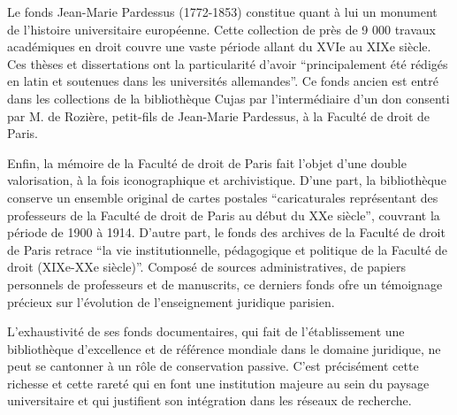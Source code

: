 Le fonds Jean-Marie Pardessus (1772-1853) constitue quant à lui un monument de l'histoire universitaire européenne. Cette collection de près de 9 000 travaux académiques en droit couvre une vaste période allant du XVIe au XIXe siècle. Ces thèses et dissertations ont la particularité d'avoir \enquote{principalement été rédigés en latin et soutenues dans les universités allemandes}. Ce fonds ancien est entré dans les collections de la bibliothèque Cujas par l'intermédiaire d'un don consenti par M. de Rozière, petit-fils de Jean-Marie Pardessus, à la Faculté de droit de Paris. 

Enfin, la mémoire de la Faculté de droit de Paris fait l'objet d'une double valorisation, à la fois iconographique et archivistique. D'une part, la bibliothèque conserve un ensemble original de cartes postales \enquote{caricaturales représentant des professeurs de la Faculté de droit de Paris au début du XXe siècle}, couvrant la période de 1900 à 1914. D'autre part, le fonds des archives de la Faculté de droit de Paris retrace \enquote{la vie institutionnelle, pédagogique et politique de la Faculté de droit (XIXe-XXe siècle)}. Composé de sources administratives, de papiers personnels de professeurs et de manuscrits, ce derniers fonds ofre un témoignage précieux sur l'évolution de l'enseignement juridique parisien.
	
L'exhaustivité de ses fonds documentaires, qui fait de l'établissement une bibliothèque d'excellence et de référence mondiale dans le domaine juridique, ne peut se cantonner à un rôle de conservation passive. C'est précisément cette richesse et cette rareté qui en font une institution majeure au sein du paysage universitaire et qui justifient son intégration dans les réseaux de recherche.